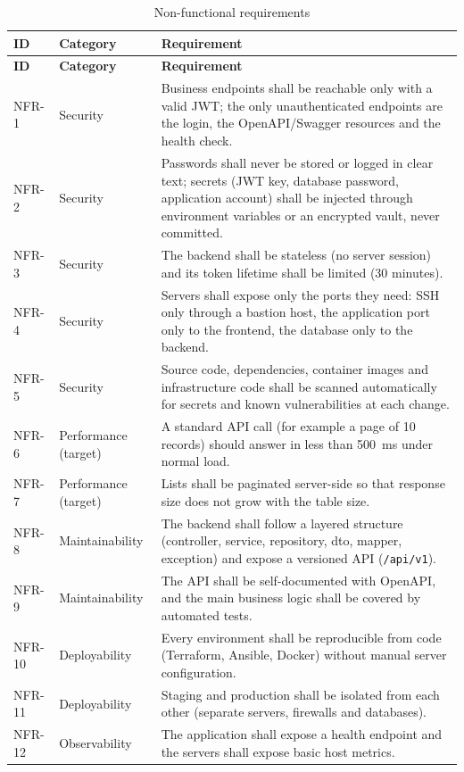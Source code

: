 {
\renewcommand{\arraystretch}{1.05}
\footnotesize
\begin{longtable}{@{}p{1.3cm}p{2.6cm}>{\raggedright\arraybackslash}p{10.4cm}@{}}
\caption{Non-functional requirements}\label{tab:nfr}\\
\toprule
\textbf{ID} & \textbf{Category} & \textbf{Requirement} \\
\midrule
\endfirsthead
\toprule
\textbf{ID} & \textbf{Category} & \textbf{Requirement} \\
\midrule
\endhead
\bottomrule
\endfoot
NFR-1 & Security & Business endpoints shall be reachable only with a valid JWT; the only unauthenticated endpoints are the login, the OpenAPI/Swagger resources and the health check. \\
NFR-2 & Security & Passwords shall never be stored or logged in clear text; secrets (JWT key, database password, application account) shall be injected through environment variables or an encrypted vault, never committed. \\
NFR-3 & Security & The backend shall be stateless (no server session) and its token lifetime shall be limited (30 minutes). \\
NFR-4 & Security & Servers shall expose only the ports they need: SSH only through a bastion host, the application port only to the frontend, the database only to the backend. \\
NFR-5 & Security & Source code, dependencies, container images and infrastructure code shall be scanned automatically for secrets and known vulnerabilities at each change. \\
NFR-6 & Performance (target) & A standard API call (for example a page of 10 records) should answer in less than 500~ms under normal load. \\
NFR-7 & Performance (target) & Lists shall be paginated server-side so that response size does not grow with the table size. \\
NFR-8 & Maintainability & The backend shall follow a layered structure (controller, service, repository, dto, mapper, exception) and expose a versioned API (\texttt{/api/v1}). \\
NFR-9 & Maintainability & The API shall be self-documented with OpenAPI, and the main business logic shall be covered by automated tests. \\
NFR-10 & Deployability & Every environment shall be reproducible from code (Terraform, Ansible, Docker) without manual server configuration. \\
NFR-11 & Deployability & Staging and production shall be isolated from each other (separate servers, firewalls and databases). \\
NFR-12 & Observability & The application shall expose a health endpoint and the servers shall expose basic host metrics. \\
\end{longtable}
}

